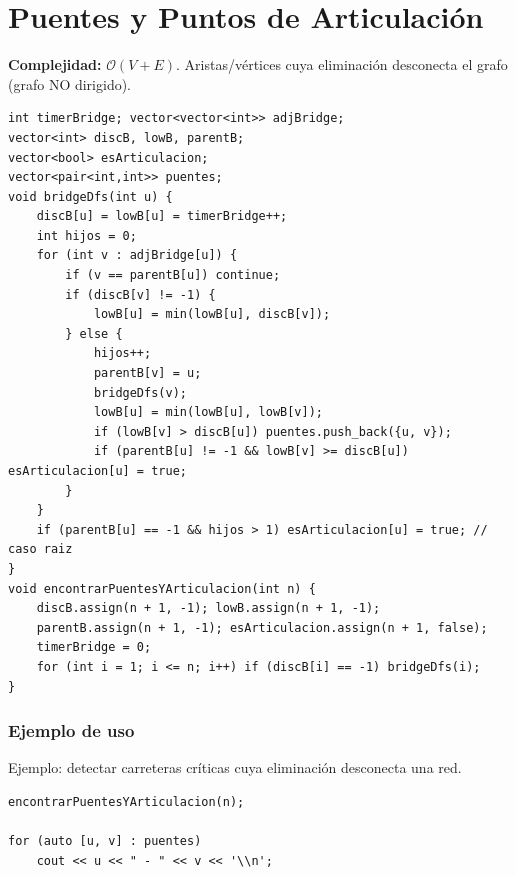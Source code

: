 \documentclass[10pt,twocolumn,letterpaper]{report}
\begin{document}
\section{Puentes y Puntos de Articulación}
\textbf{Complejidad:} $\mathcal{O}(V + E)$. Aristas/vértices cuya eliminación desconecta el grafo (grafo NO dirigido).
\begin{lstlisting}
int timerBridge; vector<vector<int>> adjBridge;
vector<int> discB, lowB, parentB;
vector<bool> esArticulacion;
vector<pair<int,int>> puentes;
void bridgeDfs(int u) {
    discB[u] = lowB[u] = timerBridge++;
    int hijos = 0;
    for (int v : adjBridge[u]) {
        if (v == parentB[u]) continue;
        if (discB[v] != -1) {
            lowB[u] = min(lowB[u], discB[v]);
        } else {
            hijos++;
            parentB[v] = u;
            bridgeDfs(v);
            lowB[u] = min(lowB[u], lowB[v]);
            if (lowB[v] > discB[u]) puentes.push_back({u, v});
            if (parentB[u] != -1 && lowB[v] >= discB[u]) esArticulacion[u] = true;
        }
    }
    if (parentB[u] == -1 && hijos > 1) esArticulacion[u] = true; // caso raiz
}
void encontrarPuentesYArticulacion(int n) {
    discB.assign(n + 1, -1); lowB.assign(n + 1, -1);
    parentB.assign(n + 1, -1); esArticulacion.assign(n + 1, false);
    timerBridge = 0;
    for (int i = 1; i <= n; i++) if (discB[i] == -1) bridgeDfs(i);
}
\end{lstlisting}
\subsubsection*{Ejemplo de uso}
Ejemplo: detectar carreteras críticas cuya eliminación desconecta una red.
\begin{lstlisting}
encontrarPuentesYArticulacion(n);

for (auto [u, v] : puentes)
    cout << u << " - " << v << '\\n';
\end{lstlisting}


\end{document}
